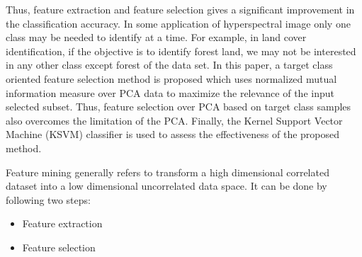 \documentclass[document.tex]{subfiles}
\begin{document}
\noindent Thus, feature extraction and feature selection gives a significant improvement in the classification accuracy. In some application of hyperspectral image only one class may be needed to identify at a time. For example, in land cover identification, if the objective is to identify forest land, we may not be interested in any other class except forest of the data set. In this paper, a target class oriented feature selection method is proposed which uses normalized mutual information measure over PCA data to maximize the relevance  of the input selected subset. Thus, feature selection over PCA based on target class samples also  overcomes the limitation of the PCA. Finally, the Kernel Support Vector Machine (KSVM) classifier is used to assess the effectiveness of the proposed method. 

\noindent Feature mining generally refers to transform a high dimensional correlated dataset into a low dimensional uncorrelated data space. It can be done by following two steps:
\begin{itemize}
	\item Feature extraction
	\item Feature selection
\end{itemize}
\end{document}
